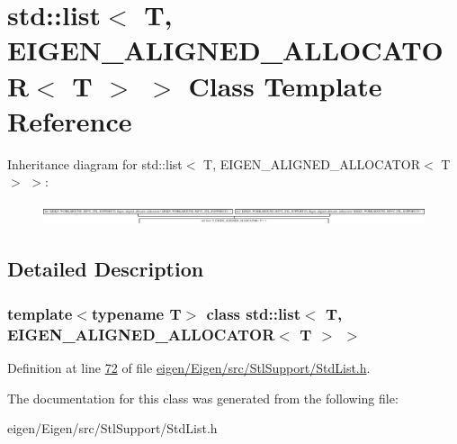 \hypertarget{classstd_1_1list_3_01_t_00_01_e_i_g_e_n___a_l_i_g_n_e_d___a_l_l_o_c_a_t_o_r_3_01_t_01_4_01_4}{}\section{std\+:\+:list$<$ T, E\+I\+G\+E\+N\+\_\+\+A\+L\+I\+G\+N\+E\+D\+\_\+\+A\+L\+L\+O\+C\+A\+T\+OR$<$ T $>$ $>$ Class Template Reference}
\label{classstd_1_1list_3_01_t_00_01_e_i_g_e_n___a_l_i_g_n_e_d___a_l_l_o_c_a_t_o_r_3_01_t_01_4_01_4}
Inheritance diagram for std\+:\+:list$<$ T, E\+I\+G\+E\+N\+\_\+\+A\+L\+I\+G\+N\+E\+D\+\_\+\+A\+L\+L\+O\+C\+A\+T\+OR$<$ T $>$ $>$\+:\begin{figure}[H]
\begin{center}
\leavevmode
\includegraphics[height=0.651163cm]{classstd_1_1list_3_01_t_00_01_e_i_g_e_n___a_l_i_g_n_e_d___a_l_l_o_c_a_t_o_r_3_01_t_01_4_01_4}
\end{center}
\end{figure}


\subsection{Detailed Description}
\subsubsection*{template$<$typename T$>$\newline
class std\+::list$<$ T, E\+I\+G\+E\+N\+\_\+\+A\+L\+I\+G\+N\+E\+D\+\_\+\+A\+L\+L\+O\+C\+A\+T\+O\+R$<$ T $>$ $>$}



Definition at line \hyperlink{eigen_2_eigen_2src_2_stl_support_2_std_list_8h_source_l00072}{72} of file \hyperlink{eigen_2_eigen_2src_2_stl_support_2_std_list_8h_source}{eigen/\+Eigen/src/\+Stl\+Support/\+Std\+List.\+h}.



The documentation for this class was generated from the following file\+:\begin{DoxyCompactItemize}
\item 
eigen/\+Eigen/src/\+Stl\+Support/\+Std\+List.\+h\end{DoxyCompactItemize}
